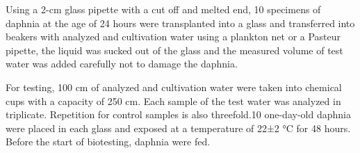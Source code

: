 
Using a 2-cm glass pipette with a cut off and melted
end, 10 specimens of daphnia at the age of 24 hours were transplanted
into a glass and transferred into beakers with analyzed and cultivation
water using a plankton net or a Pasteur pipette, the liquid was sucked
out of the glass and the measured volume of test water was added
carefully not to damage the daphnia.

For testing, 100 cm of analyzed and cultivation water
were taken into chemical cups with a capacity of 250
cm. Each sample of the test water was analyzed in
triplicate. Repetition for control samples is also threefold.10
one-day-old daphnia were placed in each glass and exposed at a
temperature of 22±2 °C for 48 hours. Before the start of biotesting,
daphnia were fed.

